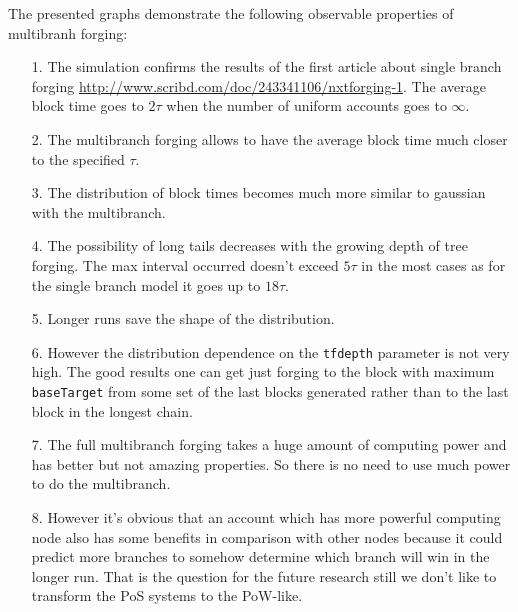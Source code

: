 \documentclass[12pt]{article}
\begin{document}
The presented graphs demonstrate the following observable properties of multibranh forging:
\begin{itemize}
\item[1.] {The simulation confirms the results of the first article about single branch forging \url{http://www.scribd.com/doc/243341106/nxtforging-1}. 
The average block time goes to $2\tau$ when the number of uniform accounts goes to $\infty$.}
\item[2.] {The multibranch forging allows to have the average block time much closer to the specified $\tau$.}
\item[3.] {The distribution of block times becomes much more similar to gaussian with the multibranch.}
\item[4.] {The possibility of long tails decreases with the growing depth of tree forging. The max interval occurred doesn't exceed $5\tau$ in the most cases as 
for the single branch model it goes up to $18\tau$.}
\item[5.] {Longer runs save the shape of the distribution.}
\item[6.] {However the distribution dependence on the \texttt{tfdepth} parameter is not very high. The good results one can get just forging to the block with
maximum \texttt{baseTarget} from some set of the last blocks generated rather than to the last block in the longest chain.}
\item[7.] {The full multibranch forging takes a huge amount of computing power and has better but not amazing properties. So there is no need to use much power to do
the multibranch.}
\item[8.] {However it's obvious that an account which has more powerful computing node also has some benefits in comparison with other nodes because it could predict
more branches to somehow determine which branch will win in the longer run. That is the question for the future research 
still we don't like to transform the PoS systems to the PoW-like.}
\end{itemize}
\end{document}
